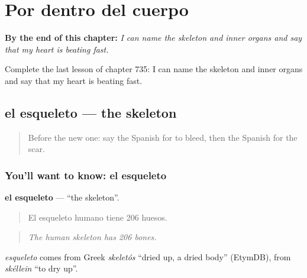 
\chapter{Por dentro del cuerpo}
\label{ch:es-por-dentro-del-cuerpo}

\begin{chapteropening}
\textbf{By the end of this chapter:} \emph{I can name the skeleton and inner organs and say that my heart is beating fast.}

Complete the last lesson of chapter 735: I can name the skeleton and inner organs and say that my heart is beating fast.
\end{chapteropening}

\section[el esqueleto]{el esqueleto — the skeleton}

\label{lesson:ES-C735-esqueleto}



\begin{quote}
Before the new one: say the Spanish for to bleed, then the Spanish for the scar.
\end{quote}

\subsection*{You'll want to know: el esqueleto}
\textbf{el esqueleto} — \textquotedblleft{}the skeleton\textquotedblright{}.

\begin{quote}
El esqueleto humano tiene 206 huesos.
\end{quote}

\begin{quote}
\emph{The human skeleton has 206 bones.}
\end{quote}

\begin{cousinweb}
\emph{esqueleto} comes from Greek \emph{skeletós} \textquotedblleft{}dried up, a dried body\textquotedblright{} (EtymDB), from \emph{skéllein} \textquotedblleft{}to dry up\textquotedblright{}.
\end{cousinweb}


